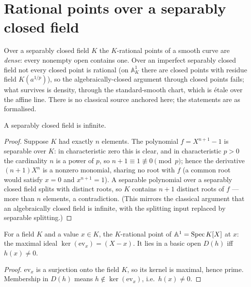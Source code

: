 \section{Rational points over a separably closed field}
\label{pa-sec:separablyClosedPoints}

Over a separably closed field \(K\) the \(K\)-rational points of a smooth curve are
\emph{dense}: every nonempty open contains one. Over an imperfect separably closed field
not every closed point is rational (on \(\mathbb{A}^1_K\) there are closed points with residue
field \(K(a^{1/p})\)), so the algebraically-closed argument through closed points fails;
what survives is density, through the standard-smooth chart, which is \'etale over the
affine line. There is no classical source anchored here; the statements are as formalised.

\begin{lemma}
  \label{pa-lem:sepClosed_infinite}
  \leanok

  A separably closed field is infinite.
\end{lemma}
\begin{proof}
  \leanok
  Suppose \(K\) had exactly \(n\) elements. The polynomial \(f = X^{n+1} - 1\) is separable
  over \(K\): in characteristic zero this is clear, and in characteristic \(p > 0\) the
  cardinality \(n\) is a power of \(p\), so \(n + 1 \equiv 1 \not\equiv 0 \pmod p\); hence
  the derivative \((n+1)X^{n}\) is a nonzero monomial, sharing no root with \(f\) (a common
  root would satisfy \(x = 0\) and \(x^{n+1} = 1\)). A separable polynomial over a separably
  closed field splits with distinct roots, so \(K\) contains \(n + 1\) distinct roots of
  \(f\) — more than \(n\) elements, a contradiction. (This mirrors the classical argument
  that an algebraically closed field is infinite, with the splitting input replaced by
  separable splitting.)
\end{proof}

\begin{definition}
  \label{pa-def:ratPt}
  \leanok

  For a field \(K\) and a value \(x \in K\), the \(K\)-rational point of
  \(\mathbb{A}^1 = \operatorname{Spec} K[X]\) at \(x\): the maximal ideal \(\ker(\mathrm{ev}_x) = (X - x)\). It
  lies in a basic open \(D(h)\) iff \(h(x) \neq 0\).
\end{definition}
\begin{proof}
  \leanok
  \(\mathrm{ev}_x\) is a surjection onto the field \(K\), so its kernel is maximal, hence
  prime. Membership in \(D(h)\) means \(h \notin \ker(\mathrm{ev}_x)\), i.e.\
  \(h(x) \neq 0\).
\end{proof}


